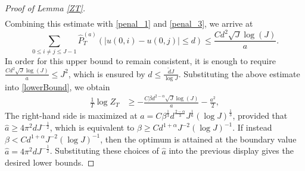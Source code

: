 \documentclass[12pt]{amsart}
\numberwithin{equation}{section}
\newcommand{\1}{\mathbf{1}}
\begin{document}
\begin{proof}[Proof of Lemma \ref{ZT}]
\begin{equation*}
\begin{split}
    \end{split}
\end{equation*}
Combining this estimate with \eqref{penal_1} and \eqref{penal_3}, we arrive at
\begin{equation*}
    \sum_{0\leq i\neq j\leq J-1}\widehat{P}_T^{(a)}(\vert u(0,i)-u(0,j)\vert\leq d)\leq
        \frac{Cd^2\sqrt{J}\log(J)}{a}.
\end{equation*}
In order for this upper bound to remain consistent, it is enough to require $\frac{Cd^2\sqrt{J}\log(J)}{a}\leq J^2$, which is ensured by $d\leq\frac{\tilde{d}J}{\log J}$. Substituting the above estimate into \eqref{lowerBound}, we obtain
\begin{equation*}
\begin{split}
        \frac{1}{T}\log Z_T &\geq -\frac{C\beta d^{2-\alpha}\sqrt{J}\log(J)}{a}-\frac{a^2}{2},
\end{split}
\end{equation*}
The right-hand side is maximized at $\hat{a}=C\beta^{\frac{1}{3}}d^{\frac{2-\alpha}{3}}J^{\frac{1}{6}}(\log J)^{\frac{1}{3}}$, provided that $\hat{a}\geq 4\pi^2d J^{-\frac{1}{2}}$, which is equivalent to $\beta\geq Cd^{1+\alpha}J^{-2}(\log J)^{-1}$. If instead $\beta<Cd^{1+\alpha}J^{-2}(\log J)^{-1}$, then the optimum is attained at the boundary value $\hat{a}=4\pi^2d J^{-\frac{1}{2}}$. Substituting these choices of $\hat a$ into the previous display gives the desired lower bounds.
\end{proof}
\end{document}
